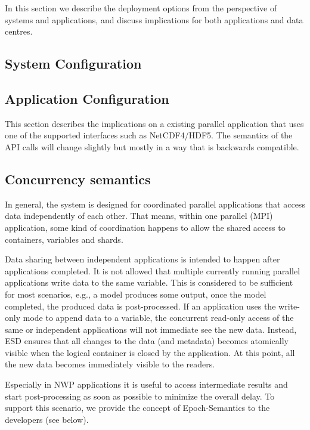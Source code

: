 In this section we describe the deployment options from the perspective of
systems and applications, and discuss implications for both applications and
data centres.

\subsection{System Configuration}


\subsection{Application Configuration}


This section describes the implications on a existing parallel application that uses one of the supported interfaces such as NetCDF4/HDF5.
The semantics of the API calls will change slightly but mostly in a way that is backwards compatible.



\subsection{Concurrency semantics}

In general, the system is designed for coordinated parallel applications that access data independently of each other.
That means, within one parallel (MPI) application, some kind of coordination happens to allow the shared access to containers, variables and shards.

Data sharing between independent applications is intended to happen after applications completed.
It is not allowed that multiple currently running parallel applications write data to the same variable.
This is considered to be sufficient for most scenarios, e.g., a model produces some output, once the model completed, the produced data is post-processed.
If an application uses the write-only mode to append data to a variable, the concurrent read-only access of the same or independent applications will not immediate see the new data.
Instead, ESD ensures that all changes to the data (and metadata) becomes atomically visible when the logical container is closed by the application.
At this point, all the new data becomes immediately visible to the readers.

Especially in NWP applications it is useful to access intermediate results and start post-processing as soon as possible to minimize the overall delay.
To support this scenario, we provide the concept of Epoch-Semantics to the developers (see below).


